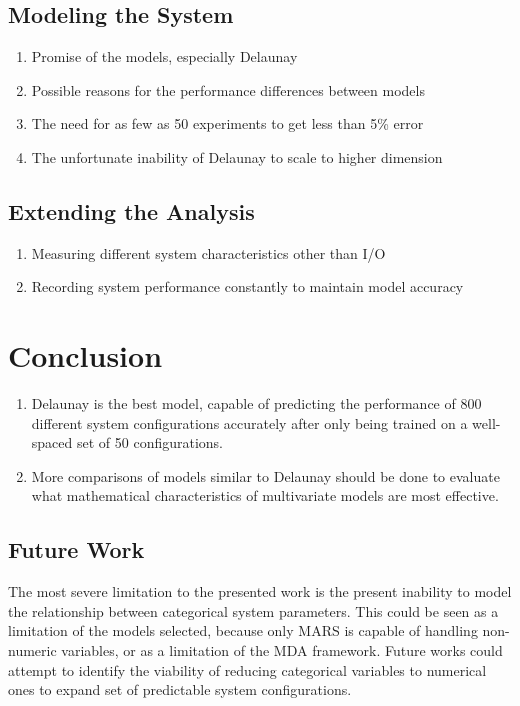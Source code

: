 \documentclass{scspaperproc}
\theoremstyle{scsthe}
\begin{document}
\subsection{Modeling the System}
\begin{enumerate}
\item Promise of the models, especially Delaunay
\item Possible reasons for the performance differences between models
\item The need for as few as 50 experiments to get less than 5\% error
\item The unfortunate inability of Delaunay to scale to higher dimension
\end{enumerate}

\subsection{Extending the Analysis}
\begin{enumerate}
\item Measuring different system characteristics other than I/O
\item Recording system performance constantly to maintain model accuracy
\end{enumerate}

\section{Conclusion}
\label{sec:conclusion}
\begin{enumerate}
\item Delaunay is the best model, capable of predicting the
  performance of 800 different system configurations accurately after
  only being trained on a well-spaced set of 50 configurations.
\item More comparisons of models similar to Delaunay should be done to
  evaluate what mathematical characteristics of multivariate models are
  most effective.
\end{enumerate}

\subsection{Future Work}
The most severe limitation to the presented work is the present
inability to model the relationship between categorical system
parameters. This could be seen as a limitation of the models selected,
because only MARS is capable of handling non-numeric variables, or as
a limitation of the MDA framework. Future works could attempt to
identify the viability of reducing categorical variables to numerical
ones to expand set of predictable system configurations.
\end{document}
